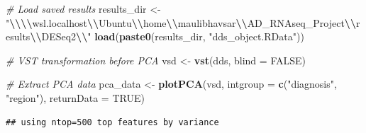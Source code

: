\documentclass[
]{article}
\newenvironment{Shaded}{\begin{snugshade}}{\end{snugshade}}
\newcommand{\AttributeTok}[1]{\textcolor[rgb]{0.13,0.29,0.53}{#1}}
\newcommand{\CommentTok}[1]{\textcolor[rgb]{0.56,0.35,0.01}{\textit{#1}}}
\newcommand{\ConstantTok}[1]{\textcolor[rgb]{0.56,0.35,0.01}{#1}}
\newcommand{\FunctionTok}[1]{\textcolor[rgb]{0.13,0.29,0.53}{\textbf{#1}}}
\newcommand{\NormalTok}[1]{#1}
\newcommand{\OtherTok}[1]{\textcolor[rgb]{0.56,0.35,0.01}{#1}}
\newcommand{\SpecialCharTok}[1]{\textcolor[rgb]{0.81,0.36,0.00}{\textbf{#1}}}
\newcommand{\StringTok}[1]{\textcolor[rgb]{0.31,0.60,0.02}{#1}}
\begin{document}
\begin{Shaded}
\begin{Highlighting}[]
\CommentTok{\# Load saved results}
\NormalTok{results\_dir }\OtherTok{\textless{}{-}} \StringTok{"}\SpecialCharTok{\textbackslash{}\textbackslash{}\textbackslash{}\textbackslash{}}\StringTok{wsl.localhost}\SpecialCharTok{\textbackslash{}\textbackslash{}}\StringTok{Ubuntu}\SpecialCharTok{\textbackslash{}\textbackslash{}}\StringTok{home}\SpecialCharTok{\textbackslash{}\textbackslash{}}\StringTok{maulibhavsar}\SpecialCharTok{\textbackslash{}\textbackslash{}}\StringTok{AD\_RNAseq\_Project}\SpecialCharTok{\textbackslash{}\textbackslash{}}\StringTok{results}\SpecialCharTok{\textbackslash{}\textbackslash{}}\StringTok{DESeq2}\SpecialCharTok{\textbackslash{}\textbackslash{}}\StringTok{"}
\FunctionTok{load}\NormalTok{(}\FunctionTok{paste0}\NormalTok{(results\_dir, }\StringTok{"dds\_object.RData"}\NormalTok{))}

\CommentTok{\# VST transformation before PCA}
\NormalTok{vsd }\OtherTok{\textless{}{-}} \FunctionTok{vst}\NormalTok{(dds, }\AttributeTok{blind =} \ConstantTok{FALSE}\NormalTok{)}

\CommentTok{\# Extract PCA data}
\NormalTok{pca\_data }\OtherTok{\textless{}{-}} \FunctionTok{plotPCA}\NormalTok{(vsd,}
                    \AttributeTok{intgroup =} \FunctionTok{c}\NormalTok{(}\StringTok{"diagnosis"}\NormalTok{, }\StringTok{"region"}\NormalTok{),}
                    \AttributeTok{returnData =} \ConstantTok{TRUE}\NormalTok{)}
\end{Highlighting}
\end{Shaded}

\begin{verbatim}
## using ntop=500 top features by variance
\end{verbatim}
\end{document}
